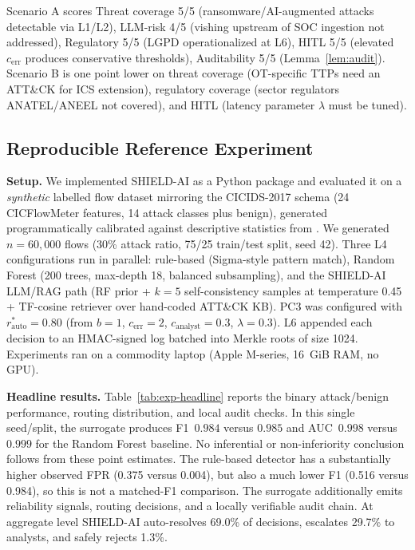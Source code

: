 \documentclass[journal]{IEEEtran}
\begin{document}
Scenario A scores Threat coverage 5/5 (ransomware/AI-augmented attacks detectable via L1/L2),
LLM-risk 4/5 (vishing upstream of SOC ingestion not addressed), Regulatory 5/5 (LGPD
operationalized at L6), HITL 5/5 (elevated $c_{\text{err}}$ produces conservative thresholds),
Auditability 5/5 (Lemma~\ref{lem:audit}). Scenario B is one point lower on threat coverage
(OT-specific TTPs need an ATT\&CK for ICS extension), regulatory coverage (sector regulators
ANATEL/ANEEL not covered), and HITL (latency parameter $\lambda$ must be tuned).

\subsection{Reproducible Reference Experiment}
\label{ssec:empirical}

\textbf{Setup.} We implemented SHIELD-AI as a Python package and evaluated it on a
\emph{synthetic} labelled flow dataset mirroring the CICIDS-2017 schema (24 CICFlowMeter
features, 14 attack classes plus benign), generated programmatically calibrated against
descriptive statistics from \cite{sharafaldin2018cicids}. We generated $n{=}60{,}000$ flows
(30\% attack ratio, 75/25 train/test split, seed 42). Three L4 configurations run in parallel:
rule-based (Sigma-style pattern match), Random Forest (200 trees, max-depth 18, balanced
subsampling), and the SHIELD-AI LLM/RAG path (RF prior + $k{=}5$ self-consistency samples
at temperature 0.45 + TF-cosine retriever over hand-coded ATT\&CK KB). PC3 was configured
with $r^*_{\text{auto}} = 0.80$ (from $b{=}1$, $c_{\text{err}}{=}2$, $c_{\text{analyst}}{=}0.3$,
$\lambda{=}0.3$). L6 appended each decision to an HMAC-signed log batched into Merkle roots
of size 1024. Experiments ran on a commodity laptop (Apple M-series, 16~GiB RAM, no GPU).

\textbf{Headline results.} Table~\ref{tab:exp-headline} reports the binary attack/benign
performance, routing distribution, and local audit checks. In this single seed/split, the
surrogate produces F1~$0.984$ versus $0.985$ and AUC~$0.998$ versus $0.999$ for the Random
Forest baseline. No inferential or non-inferiority conclusion follows from these point
estimates. The rule-based detector has a substantially higher observed FPR (0.375 versus
0.004), but also a much lower F1 (0.516 versus 0.984), so this is not a matched-F1 comparison.
The surrogate additionally emits reliability signals, routing decisions, and a locally
verifiable audit chain.
At aggregate level SHIELD-AI auto-resolves 69.0\% of decisions, escalates 29.7\% to analysts,
and safely rejects 1.3\%.
\end{document}
